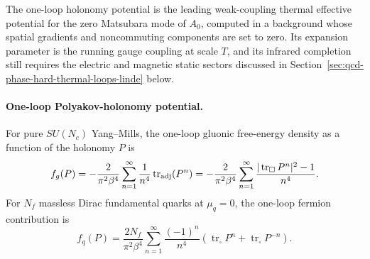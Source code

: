 \begin{controlledapproximation}
\label{ca:qcd-one-loop-holonomy-regime}
The one-loop holonomy potential is the leading weak-coupling thermal
effective potential for the zero Matsubara mode of \(A_0\), computed in a
background whose spatial gradients and noncommuting components are set to
zero.  Its expansion parameter is the running gauge coupling at scale
\(T\), and its infrared completion still requires the electric and magnetic
static sectors discussed in
Section~\ref{sec:qcd-phase-hard-thermal-loops-linde} below.
\end{controlledapproximation}

\paragraph{One-loop Polyakov-holonomy potential.}
For pure \(SU(N_c)\) Yang--Mills, the one-loop gluonic free-energy density
as a function of the holonomy \(P\) is
\begin{equation}
  f_g(P)
  =
  -\frac{2}{\pi^2\beta^4}
  \sum_{n=1}^{\infty}
  \frac{1}{n^4}\operatorname{tr}_{\rm adj}(P^n)
  =
  -\frac{2}{\pi^2\beta^4}
  \sum_{n=1}^{\infty}
  \frac{|\operatorname{tr}_{\square}P^n|^2-1}{n^4}.
  \label{eq:qcd-weiss-gluon-potential}
\end{equation}
For \(N_f\) massless Dirac fundamental quarks at \(\mu_q=0\), the one-loop
fermion contribution is
\begin{equation}
  f_q(P)
  =
  \frac{2N_f}{\pi^2\beta^4}
  \sum_{n=1}^{\infty}\frac{(-1)^n}{n^4}
  \left(
    \operatorname{tr}_{\square}P^n+
    \operatorname{tr}_{\square}P^{-n}
  \right).
  \label{eq:qcd-weiss-quark-potential}
\end{equation}

